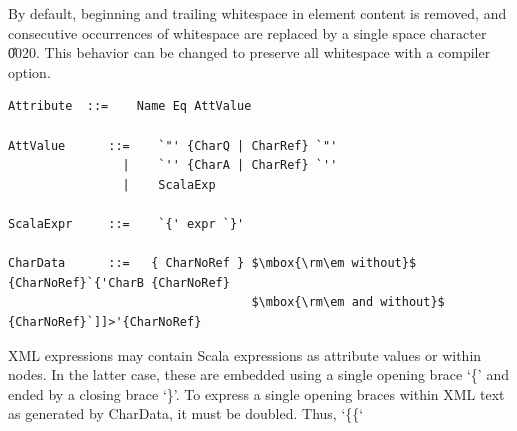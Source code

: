 By default, beginning and trailing whitespace in element content is removed, 
and consecutive occurrences of whitespace are replaced by a single space
character \U{0020}. This behavior can be changed to preserve all whitespace
with a compiler option.
\syntax\begin{lstlisting}
Attribute  ::=    Name Eq AttValue                                    

AttValue      ::=    `"' {CharQ | CharRef} `"'
                |    `'' {CharA | CharRef} `''
                |    ScalaExp

ScalaExpr     ::=    `{' expr `}'

CharData      ::=   { CharNoRef } $\mbox{\rm\em without}$ {CharNoRef}`{'CharB {CharNoRef} 
                                  $\mbox{\rm\em and without}$ {CharNoRef}`]]>'{CharNoRef}
\end{lstlisting}
XML expressions may contain Scala expressions as attribute values or
within nodes. In the latter case, these are embedded using a single opening 
brace `\{' and ended by a closing brace `\}'. To express a single opening braces 
within XML text as generated by CharData, it must be doubled. Thus, `\{\{` 
